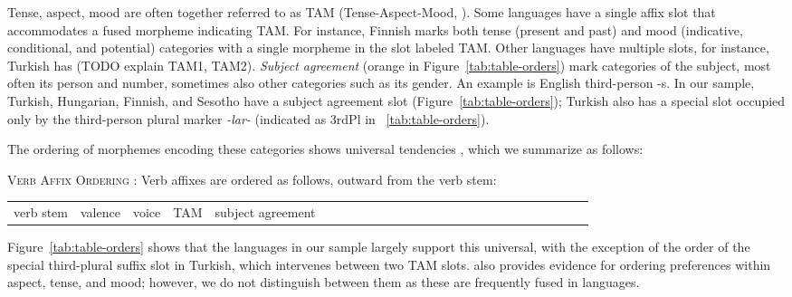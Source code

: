 \documentclass[11pt,letterpaper]{article}
\newcommand{\citep}{\parencite}
\newcommand{\citet}{\Textcite}
\begin{document}
Tense, aspect, mood are often together referred to as TAM (Tense-Aspect-Mood, \citep{bybee1994the, wals-69}).
Some languages have a single affix slot that accommodates a fused morpheme indicating TAM.
For instance, Finnish marks both tense (present and past) and mood (indicative, conditional, and potential) categories with a single morpheme in the slot labeled TAM.
Other languages have multiple slots, for instance, Turkish has (TODO explain TAM1, TAM2).
\textit{Subject agreement} (orange in Figure~\ref{tab:table-orders}) mark categories of the subject, most often its person and number, sometimes also other categories such as its gender.
An example is English third-person -s.
In our sample, Turkish, Hungarian, Finnish, and Sesotho have a subject agreement slot (Figure~\ref{tab:table-orders}); Turkish also has a special slot occupied only by the third-person plural marker \textit{-lar-} (indicated as 3rdPl in ~\ref{tab:table-orders}).

The ordering of morphemes encoding these categories shows universal tendencies \citep{bybee-morphology-1985}, which we summarize as follows:


\begin{adjustwidth}{6em}{6em}
\textsc{Verb Affix Ordering} \citep{bybee-morphology-1985}:
Verb affixes are ordered as follows, outward from the verb stem:

\begin{tabular}{llllllllllllllllllllllllll}
verb stem & valence & voice & TAM & subject agreement
\end{tabular}
\end{adjustwidth}


Figure~\ref{tab:table-orders} shows that the languages in our sample largely support this universal, with the exception of the order of the special third-plural suffix slot in Turkish, which intervenes between two TAM slots.
\citet{bybee-morphology-1985} also provides evidence for ordering preferences within aspect, tense, and mood; however, we do not distinguish between them as these are frequently fused in languages.
\end{document}
